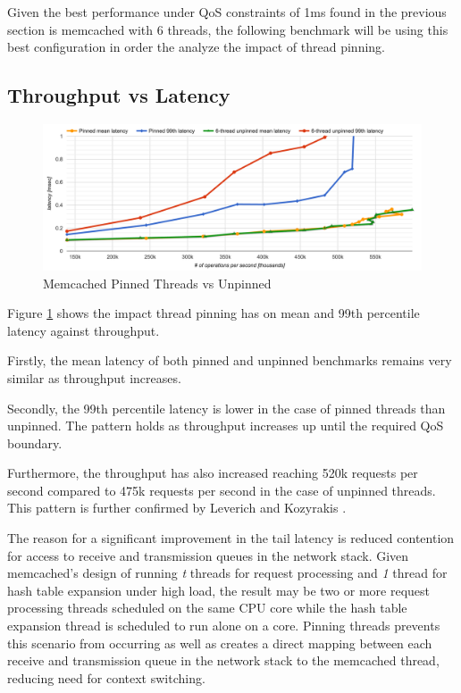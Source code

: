 Given the best performance under QoS constraints of 1ms found in the previous section is memcached with 6 threads, the following benchmark will be using this best configuration in order the analyze the impact of thread pinning.

\subsection{Throughput vs Latency}

\begin{figure}[h]
    \includegraphics[width=\textwidth]{./res/5_threads_pinned.png}
    \caption{Memcached Pinned Threads vs Unpinned}
    \label{fig:memcached-threads-pinned}
\end{figure}

Figure \ref{fig:memcached-threads-pinned} shows the impact thread pinning has on mean and 99th percentile latency against throughput.

Firstly, the mean latency of both pinned and unpinned benchmarks remains very similar as throughput increases.

Secondly, the 99th percentile latency is lower in the case of pinned threads than unpinned. The pattern holds as throughput increases up until the required QoS boundary.

Furthermore, the throughput has also increased reaching 520k requests per second compared to 475k requests per second in the case of unpinned threads. This pattern is further confirmed by  Leverich and Kozyrakis \cite{leverich2014reconciling}.

The reason for a significant improvement in the tail latency is reduced contention for access to receive and transmission queues in the network stack. Given memcached's design of running \textit{t} threads for request processing and \textit{1} thread for hash table expansion under high load, the result may be two or more request processing threads scheduled on the same CPU core while the hash table expansion thread is scheduled to run alone on a core. Pinning threads prevents this scenario from occurring as well as creates a direct mapping between each receive and transmission queue in the network stack to the memcached thread, reducing need for context switching.


